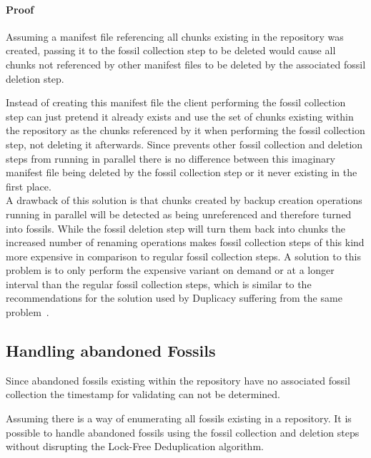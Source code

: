 \paragraph{Proof} Assuming a manifest file referencing all chunks existing in
the repository was created, passing it to the fossil collection step to be deleted
would cause all chunks not referenced by other manifest files to be deleted by the
associated fossil deletion step.

Instead of creating this manifest file the client performing the fossil collection
step can just pretend it already exists and use the set of chunks existing within
the repository as the chunks referenced by it when performing the fossil collection
step, not deleting it afterwards.
Since  prevents other fossil collection and deletion steps
from running in parallel there is no difference between this imaginary manifest file
being deleted by the fossil collection step or it never existing in the first place. \\

A drawback of this solution is that chunks created by backup creation operations
running in parallel will be detected as being unreferenced and therefore turned
into fossils.
While the fossil deletion step will turn them back into chunks the increased
number of renaming operations makes fossil collection steps of this kind more
expensive in comparison to regular fossil collection steps.
A solution to this problem is to only perform the expensive variant on demand
or at a longer interval than the regular fossil collection steps, which is
similar to the recommendations for the solution used by Duplicacy suffering
from the same problem~\cite[topic `Prune command details']{Duplicacy-Forum}.

\subsection{Handling abandoned Fossils}\label{sec:abandoned-fossils}

Since abandoned fossils existing within the repository have no associated fossil
collection the timestamp for validating  can not be determined.

\begin{thm}\label{thm:abandoned-fossils}
    Assuming there is a way of enumerating all fossils existing in a repository.
    It is possible to handle abandoned fossils using the fossil collection and
    deletion steps without disrupting the Lock-Free Deduplication algorithm.
\end{thm}

